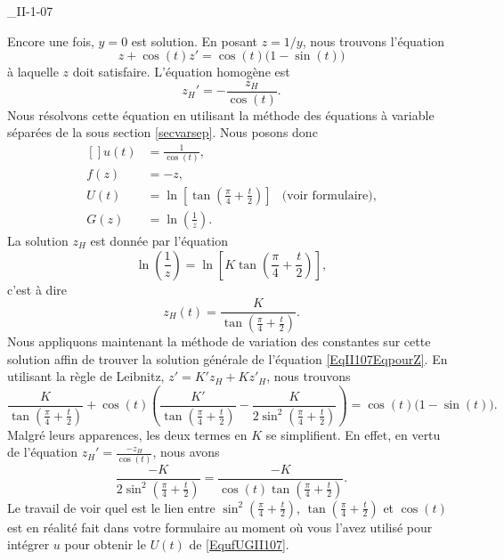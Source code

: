 \begin{corrige}{_II-1-07}
\begin{enumerate}
Encore une fois, $y=0$ est solution. En posant $z=1/y$, nous trouvons l'équation
\begin{equation}		\label{EqII107EqpourZ}
	z+\cos(t)z'=\cos(t)\big(1-\sin(t)\big)
\end{equation}
à laquelle $z$ doit satisfaire. L'équation homogène est
\begin{equation}
	z_H'=-\frac{ z_H }{ \cos(t) }.
\end{equation}
Nous résolvons cette équation en utilisant la méthode des équations à variable séparées de la sous section \ref{secvarsep}. Nous posons donc
\begin{equation}		\label{EqufUGII107}
	\begin{aligned}[]
		u(t)	&=\frac{1}{ \cos(t) }, \\
		f(z)	&=-z,\\
		U(t)	&=\ln\left[ \tan\left( \frac{ \pi }{ 4 }+\frac{ t }{ 2 } \right) \right]	&\text{(voir formulaire)},\\
		G(z)	&=\ln\left( \frac{1}{ z } \right).
	\end{aligned}
\end{equation}
La solution $z_H$ est donnée par l'équation
\begin{equation}
	\ln\left( \frac{1}{ z } \right)=\ln\left[ K\tan\left( \frac{ \pi }{ 4 }+\frac{ t }{ 2 } \right) \right],
\end{equation}
c'est à dire
\begin{equation}
	z_H(t)=\frac{ K }{ \tan\left( \frac{ \pi }{ 4 }+\frac{ t }{ 2 } \right) }.
\end{equation}
Nous appliquons maintenant la méthode de variation des constantes sur cette solution affin de trouver la solution générale de l'équation \eqref{EqII107EqpourZ}. En utilisant la règle de Leibnitz, $z'=K'z_H+Kz'_H$, nous trouvons
\begin{equation}
	\frac{ K }{ \tan\left( \frac{ \pi }{ 4 }+\frac{ t }{ 2 } \right) }+\cos(t)\left( \frac{ K' }{  \tan\left( \frac{ \pi }{ 4 }+\frac{ t }{ 2 } \right) }-\frac{ K }{ 2\sin^2 \left( \frac{ \pi }{ 4 }+\frac{ t }{ 2 } \right)  } \right)=\cos(t)\big( 1-\sin(t) \big).
\end{equation}
Malgré leurs apparences, les deux termes en $K$ se simplifient. En effet, en vertu de l'équation $z_H'=\frac{ -z_H }{ \cos(t) }$, nous avons
\begin{equation}
	\frac{ -K }{ 2\sin^2\left( \frac{ \pi }{ 4 }+\frac{ t }{ 2 } \right)}=\frac{ -K }{ \cos(t)\tan\left( \frac{ \pi }{ 4 }+\frac{ t }{ 2 } \right) }.
\end{equation}
Le travail de voir quel est le lien entre $\sin^2\left( \frac{ \pi }{ 4 }+\frac{ t }{ 2 } \right)$, $\tan\left( \frac{ \pi }{ 4 }+\frac{ t }{ 2 } \right)$ et $\cos(t)$ est en réalité fait dans votre formulaire au moment où vous l'avez utilisé pour intégrer $u$ pour obtenir le $U(t)$ de \eqref{EqufUGII107}.


\end{enumerate}
\end{corrige}
